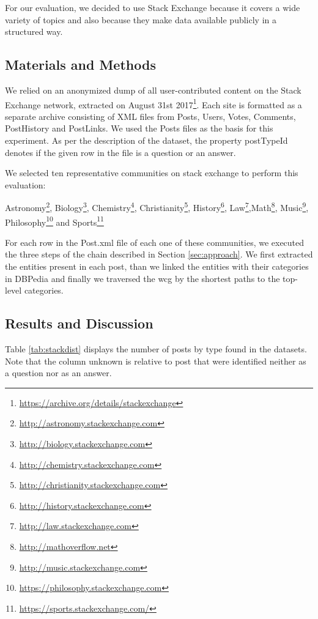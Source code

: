For our evaluation, we decided to use Stack Exchange because it covers a wide variety of topics and also because they make data available publicly in a structured way. 

\subsection{\hspace*{3pt} Materials and Methods}

We relied on an anonymized dump of all user-contributed content on the Stack Exchange network, extracted on August 31st 2017\footnote{\url{https://archive.org/details/stackexchange}}. Each site is formatted as a separate archive consisting of XML files from Posts, Users, Votes, Comments, PostHistory and PostLinks. We used the Posts files as the basis for this experiment. As per the description of the dataset, the property postTypeId denotes if the given row in the file is a question or an answer. 

We selected ten representative communities on stack exchange to perform this evaluation: 

Astronomy\footnote{\url{http://astronomy.stackexchange.com}}, 
Biology\footnote{\url{http://biology.stackexchange.com}},
Chemistry\footnote{\url{http://chemistry.stackexchange.com}}, Christianity\footnote{\url{http://christianity.stackexchange.com}}, History\footnote{\url{http://history.stackexchange.com}}, Law\footnote{\url{http://law.stackexchange.com}},Math\footnote{\url{http://mathoverflow.net}}, Music\footnote{\url{http://music.stackexchange.com}}, Philosophy\footnote{\url{https://philosophy.stackexchange.com}} and Sports\footnote{\url{https://sports.stackexchange.com/}}

For each row in the Post.xml file of each one of these communities, we executed the three steps of the chain described in Section \ref{sec:approach}. We first extracted the entities present in each post, than we linked the entities with their categories in DBPedia and finally we traversed the \gls{wcg} by the shortest paths to the top-level categories. 

\subsection{\hspace*{3pt} Results and Discussion}

Table \ref{tab:stackdist} displays the number of posts by type found in the datasets. Note that the column unknown is relative to post that were identified neither as a question nor as an answer. 


